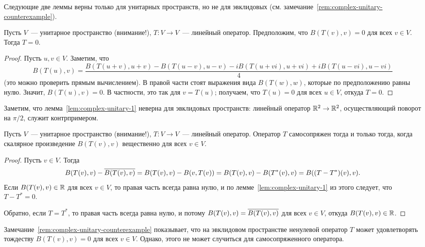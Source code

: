 Следующие две леммы верны только для унитарных пространств,
но не для эвклидовых
(см. замечание~\ref{rem:complex-unitary-counterexample}).

\begin{lemma}\label{lem:complex-unitary-1}
Пусть $V$~--- унитарное пространство (внимание!),
$T\colon V\to V$~--- линейный оператор.
Предположим, что $B(T(v),v) = 0$ для всех $v\in V$.
Тогда $T = 0$.
\end{lemma}
\begin{proof}
Пусть $u,v\in V$.
Заметим, что
$$
B(T(u),v) =
\frac{B(T(u+v),u+v) - B(T(u-v),u-v) - iB(T(u+vi),u+vi) + iB(T(u-vi),u-vi)}{4}
$$
(это можно проверить прямым вычислением).
В правой части стоят выражения вида $B(T(w),w)$, которые
по предположению равны нулю. Значит, $B(T(u),v)=0$.
В частности, это так для $v = T(u)$; получаем, что $T(u)=0$
для всех $u\in V$, откуда $T=0$.
\end{proof}

\begin{remark}\label{rem:complex-unitary-counterexample}
Заметим, что лемма~\ref{lem:complex-unitary-1} неверна для
эвклидовых пространств: линейный оператор $\mathbb R^2\to\mathbb R^2$,
осуществляющий поворот на $\pi/2$, служит контрпримером.
\end{remark}

\begin{lemma}
Пусть $V$~--- унитарное пространство (внимание!),
$T\colon V\to V$~--- линейный оператор.
Оператор $T$ самосопряжен тогда и только тогда, когда
скалярное произведение $B(T(v),v)$ вещественно
для всех $v\in V$.
\end{lemma}
\begin{proof}
Пусть $v\in V$.
Тогда 
$$
B(T(v),v) - \overline{B(T(v),v)} = B(T(v),v) - B(v,T(v))
= B(T(v),v) - B(T^*(v),v)
= B((T-T^*)(v),v).
$$
Если $B(T(v),v)\in\mathbb R$ для всех $v\in V$, то правая часть
всегда равна нулю, и по лемме~\ref{lem:complex-unitary-1}
из этого следует, что $T-T^*=0$.

Обратно, если $T = T^*$, то правая часть всегда равна нулю,
и потому $B(T(v),v) = \overline{B(T(v),v)}$ для всех $v\in V$,
откуда $B(T(v),v)\in\mathbb R$.
\end{proof}

\begin{remark}
Замечание~\ref{rem:complex-unitary-counterexample} показывает,
что на эвклидовом пространстве ненулевой оператор $T$ может удовлетворять
тождеству $B(T(v),v)=0$ для всех $v\in V$. Однако,
этого не может случиться для самосопряженного оператора.
\end{remark}


